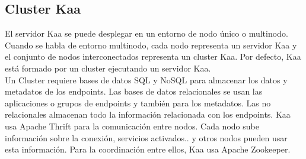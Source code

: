 \documentclass[12pt, twoside]{book}
\begin{document}
\subsection*{Cluster Kaa}
El servidor Kaa se puede desplegar en un entorno de nodo único o multinodo. Cuando se habla de entorno multinodo, cada nodo representa un servidor Kaa y el conjunto de nodos interconectados representa un cluster Kaa. Por defecto, Kaa está formado por un cluster ejecutando un servidor Kaa.\\

Un Cluster requiere bases de datos SQL y NoSQL para almacenar los datos y metadatos de los endpoints. Las bases de datos relacionales se usan  las aplicaciones o grupos de endpoints y también para los metadatos. Las no relacionales almacenan todo la información relacionada con los endpoints. Kaa usa Apache Thrift\cite{apache_thrift} para la comunicación entre nodos. Cada  nodo sube información sobre la conexión, servicios activados.. y otros nodos pueden usar esta información. Para la coordinación entre ellos, Kaa usa Apache Zookeeper\cite{zookeeper}.\\
\end{document}
